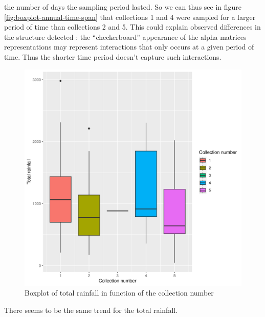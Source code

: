 the number of days the sampling period lasted.
So we can thus see in figure \ref{fig:boxplot-annual-time-span} that
collections 1 and 4 were sampled for a larger period of time than
collections 2 and 5. This could explain observed differences in the
structure detected : the ``checkerboard'' appearance of the alpha
matrices representations may represent interactions that only occurs at
a given period of time. Thus the shorter time period doesn't capture
such interactions.

\begin{figure}
\centering
\includegraphics{./img/5bbc4b4b07c0e990a3ae2755165958ffbf517902.png}
\caption{\label{fig:boxplot-total-rainfall}Boxplot of total rainfall in
function of the collection number}
\end{figure}

There seems to be the same trend for the total rainfall.

